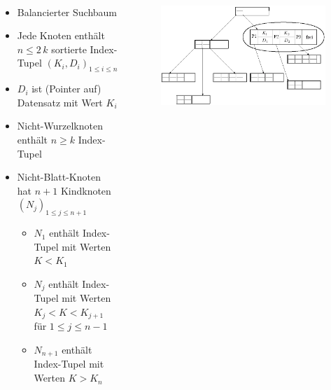 \begin{frame}{\insertsection}
\framesubtitle{\insertsubsection}
\begin{columns}
	\begin{column}{.65\textwidth}
		\begin{definition}
			\begin{itemize}
				\item Balancierter Suchbaum
				\item Jede Knoten enthält $n\le 2\,k$ sortierte Index-Tupel $(K_i,D_i)_{1\le i\le n}$\pause
				\item $D_i$ ist (Pointer auf) Datensatz mit Wert $K_i$\pause
				\item Nicht-Wurzelknoten enthält $n\ge k$ Index-Tupel\pause
				\item Nicht-Blatt-Knoten hat $n + 1$ Kindknoten $(N_j)_{1\le j \le n+1}$\pause
				\begin{itemize}
					\item $N_1$ enth\"alt Index-Tupel mit Werten $K < K_1$\pause
					\item $N_j$ enth\"alt Index-Tupel mit Werten $K_{j} < K < K_{j+1}$ f\"ur $1\le j\le n-1$\pause
					\item $N_{n+1}$ enth\"alt Index-Tupel mit Werten $K > K_n$
				\end{itemize}
			\end{itemize}
		\end{definition}
	\end{column}
	\onslide
	\begin{column}{.345\textwidth}
		\begin{figure}
			\includegraphics[scale=0.255]{img/BTree-1.png}
		\end{figure}
	\end{column}
\end{columns}
\end{frame}

